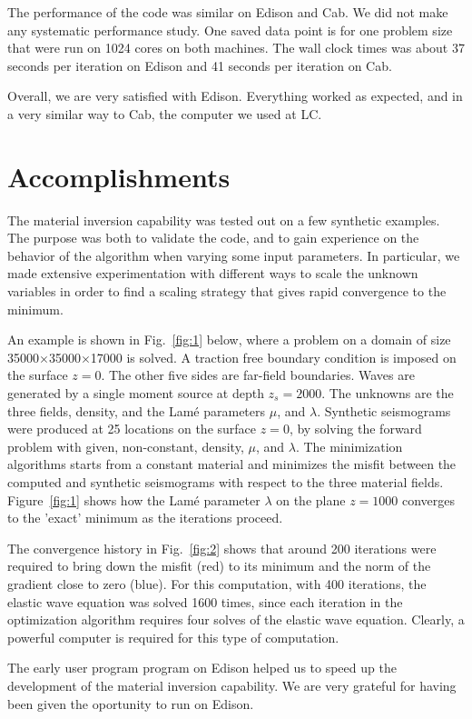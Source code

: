 \documentclass[12pt]{article}
\begin{document}
The performance of the code was similar on Edison and Cab. We did not make any systematic performance study. 
One saved data point is for one problem size that were run on 1024 cores on both machines. The wall clock
times was about 37 seconds per iteration on Edison and 41 seconds per iteration on Cab.

Overall, we are very satisfied with Edison. Everything worked as expected, and in a very similar way to
Cab, the computer we used at LC.

\section{Accomplishments}
The material inversion capability was tested out on a few synthetic examples. The purpose was both to 
validate the code, and to gain experience on the behavior of the algorithm when varying some input
parameters. In particular, we made extensive experimentation with different ways to scale the unknown
variables in order to find a scaling strategy that gives rapid convergence to the minimum. 

An example is shown in Fig.~\ref{fig:1} below, where a problem on a domain of 
size 35000$\times$35000$\times$17000 is solved. A traction free boundary condition is imposed
on the surface $z=0$. The other five sides are far-field boundaries. Waves are generated by a single 
moment source at depth $z_s=2000$.
The unknowns are the three fields, density, and the Lam\'e parameters $\mu$, and $\lambda$. 
Synthetic seismograms were produced at 25 locations on the surface $z=0$, by solving the forward problem 
with given, non-constant, density, $\mu$, and $\lambda$. The minimization algorithms starts from a constant
material and minimizes the misfit between the computed and synthetic seismograms with respect to the 
three material fields.
Figure~\ref{fig:1} shows how the Lam\'e parameter $\lambda$ on the plane $z=1000$ converges to the 'exact' 
minimum as the iterations proceed. 

The convergence history in Fig.~\ref{fig:2} shows that around 200 iterations were required to bring down 
the misfit (red) to its minimum and the norm of the gradient close to zero (blue). For this computation, with
400 iterations, the elastic wave equation was solved 1600 times, since each iteration in the optimization algorithm 
requires four solves of the elastic wave equation.  Clearly, a powerful computer is required for this type of 
computation. 

The early user program program on Edison helped us to speed up the development of the material inversion 
capability. We are very grateful for having been given the oportunity to run on Edison.
\end{document}
